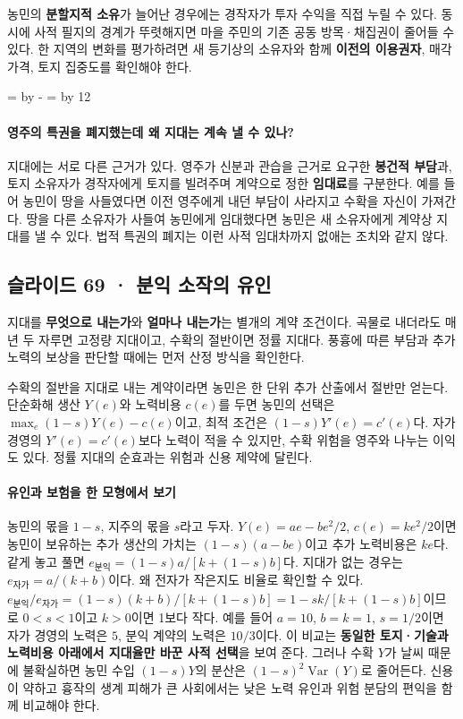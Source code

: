 \documentclass[10pt,a4paper]{article}
\newcommand{\ReserveQuestionSpace}{%
  \par\begingroup
  \dimen0=\pagegoal \advance\dimen0 by -\pagetotal
  \dimen2=\baselineskip \multiply\dimen2 by 12
  \ifdim\dimen0<\dimen2 \newpage\fi
  \endgroup}
\begin{document}
농민의 \textbf{분할지적 소유}가 늘어난 경우에는 경작자가 투자 수익을 직접 누릴 수 있다. 동시에 사적 필지의 경계가 뚜렷해지면 마을 주민의 기존 공동 방목·채집권이 줄어들 수 있다. 한 지역의 변화를 평가하려면 새 등기상의 소유자와 함께 \textbf{이전의 이용권자}, 매각 가격, 토지 집중도를 확인해야 한다.\par

\ReserveQuestionSpace
\paragraph{영주의 특권을 폐지했는데 왜 지대는 계속 낼 수 있나?}
지대에는 서로 다른 근거가 있다. 영주가 신분과 관습을 근거로 요구한 \textbf{봉건적 부담}과, 토지 소유자가 경작자에게 토지를 빌려주며 계약으로 정한 \textbf{임대료}를 구분한다. 예를 들어 농민이 땅을 사들였다면 이전 영주에게 내던 부담이 사라지고 수확을 자신이 가져간다. 땅을 다른 소유자가 사들여 농민에게 임대했다면 농민은 새 소유자에게 계약상 지대를 낼 수 있다. 법적 특권의 폐지는 이런 사적 임대차까지 없애는 조치와 같지 않다.\par

\subsection{슬라이드 69 · 분익 소작의 유인}
지대를 \textbf{무엇으로 내는가}와 \textbf{얼마나 내는가}는 별개의 계약 조건이다. 곡물로 내더라도 매년 두 자루면 고정량 지대이고, 수확의 절반이면 정률 지대다. 풍흉에 따른 부담과 추가 노력의 보상을 판단할 때에는 먼저 산정 방식을 확인한다.\par

수확의 절반을 지대로 내는 계약이라면 농민은 한 단위 추가 산출에서 절반만 얻는다. 단순화해 생산 $Y(e)$와 노력비용 $c(e)$를 두면 농민의 선택은 $\max_e (1-s)Y(e)-c(e)$이고, 최적 조건은 $(1-s)Y'(e)=c'(e)$다. 자가 경영의 $Y'(e)=c'(e)$보다 노력이 적을 수 있지만, 수확 위험을 영주와 나누는 이익도 있다. 정률 지대의 순효과는 위험과 신용 제약에 달린다.\par

\paragraph{유인과 보험을 한 모형에서 보기}

농민의 몫을 $1-s$, 지주의 몫을 $s$라고 두자. $Y(e)=ae-be^2/2$, $c(e)=ke^2/2$이면 농민이 보유하는 추가 생산의 가치는 $(1-s)(a-be)$이고 추가 노력비용은 $ke$다. 같게 놓고 풀면 $e_{\mbox{분익}}=(1-s)a/[k+(1-s)b]$다. 지대가 없는 경우는 $e_{\mbox{자가}}=a/(k+b)$이다. 왜 전자가 작은지도 비율로 확인할 수 있다. $e_{\mbox{분익}}/e_{\mbox{자가}}=(1-s)(k+b)/[k+(1-s)b]=1-sk/[k+(1-s)b]$이므로 $0<s<1$이고 $k>0$이면 1보다 작다. 예를 들어 $a=10$, $b=k=1$, $s=1/2$이면 자가 경영의 노력은 $5$, 분익 계약의 노력은 $10/3$이다. 이 비교는 \textbf{동일한 토지·기술과 노력비용 아래에서 지대율만 바꾼 사적 선택}을 보여 준다. 그러나 수확 $Y$가 날씨 때문에 불확실하면 농민 수입 $(1-s)Y$의 분산은 $(1-s)^2\operatorname{Var}(Y)$로 줄어든다. 신용이 약하고 흉작의 생계 피해가 큰 사회에서는 낮은 노력 유인과 위험 분담의 편익을 함께 비교해야 한다.\par
\end{document}
